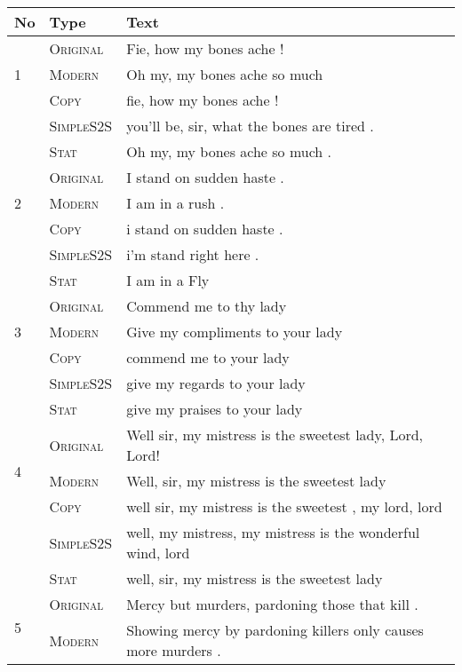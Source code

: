 \begin{table}
\centering
\tiny
\addtolength{\tabcolsep}{-4pt}
\begin{tabular}{|l|l|l| }
\hline 
No & Type  & Text \\ \hline \hline
\multirow{3}{*}{1} &  \textsc{Original} & Fie, how my bones ache ! \\
&  \textsc{Modern} & Oh my, my bones ache so much  \\
& \textsc{Copy} & fie, how my bones ache ! \\  
& \textsc{SimpleS2S} & you'll be, sir, what the bones are tired . \\
& \textsc{Stat} & Oh my, my bones ache so much . \\ \hline \hline
\multirow{3}{*}{2} &  \textsc{Original} & I stand on sudden haste . \\
& \textsc{Modern} & I am in a rush .  \\
& \textsc{Copy} & i stand on sudden haste . \\  
& \textsc{SimpleS2S} & i'm stand right here . \\
& \textsc{Stat} & I am in a Fly \\ \hline \hline
\multirow{3}{*}{3} &  \textsc{Original} & Commend me to thy lady \\
&  \textsc{Modern} & Give my compliments to your lady  \\
& \textsc{Copy} & commend me to your lady \\  
& \textsc{SimpleS2S} & give my regards to your lady \\
& \textsc{Stat} & give my praises to your lady \\ \hline \hline
\multirow{3}{*}{4} &  \textsc{Original} & Well sir, my mistress is the sweetest lady, Lord, Lord! \\
&  \textsc{Modern} & Well, sir, my mistress is the sweetest lady  \\
& \textsc{Copy} & well sir, my mistress is the sweetest , my lord, lord \\  
& \textsc{SimpleS2S} & well, my mistress, my mistress is the wonderful wind, lord \\
& \textsc{Stat} & well, sir, my mistress is the sweetest lady \\ \hline \hline
\multirow{3}{*}{5} &  \textsc{Original} & Mercy but murders, pardoning those that kill . \\
&  \textsc{Modern} & Showing mercy by pardoning killers only causes more murders .  \\

\end{tabular}
\end{table}
